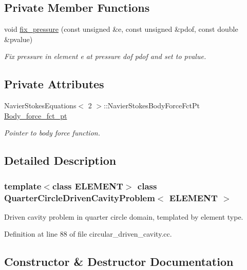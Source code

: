 \subsection*{Private Member Functions}
\begin{DoxyCompactItemize}
\item 
void \hyperlink{classQuarterCircleDrivenCavityProblem_a0c4e0cb1a4fb12053142fa43f899a5b1}{fix\+\_\+pressure} (const unsigned \&e, const unsigned \&pdof, const double \&pvalue)
\begin{DoxyCompactList}\small\item\em Fix pressure in element e at pressure dof pdof and set to pvalue. \end{DoxyCompactList}\end{DoxyCompactItemize}
\subsection*{Private Attributes}
\begin{DoxyCompactItemize}
\item 
Navier\+Stokes\+Equations$<$ 2 $>$\+::Navier\+Stokes\+Body\+Force\+Fct\+Pt \hyperlink{classQuarterCircleDrivenCavityProblem_a66bd39fdcb467ebdb6afe9446d4566f3}{Body\+\_\+force\+\_\+fct\+\_\+pt}
\begin{DoxyCompactList}\small\item\em Pointer to body force function. \end{DoxyCompactList}\end{DoxyCompactItemize}


\subsection{Detailed Description}
\subsubsection*{template$<$class E\+L\+E\+M\+E\+NT$>$\newline
class Quarter\+Circle\+Driven\+Cavity\+Problem$<$ E\+L\+E\+M\+E\+N\+T $>$}

Driven cavity problem in quarter circle domain, templated by element type. 

Definition at line 88 of file circular\+\_\+driven\+\_\+cavity.\+cc.



\subsection{Constructor \& Destructor Documentation}
\mbox{\label{classQuarterCircleDrivenCavityProblem_ae5fd69acf7d28a600cb6aa0bbb6a341c}} 
